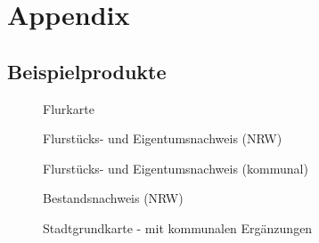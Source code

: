 \part*{Appendix}
\appendix
\chapter{Beispielprodukte}
\begin{figure}[htbp]
	\centering
	\caption{Flurkarte}
	\label{fig:flurkarte}
\end{figure}
\begin{figure}[htbp]
	\centering
	\caption{Flurstücks- und Eigentumsnachweis (NRW)}
	\label{fig:eigentumsnachweis_nrw}
\end{figure}
\begin{figure}[htbp]
	\centering
	\caption{Flurstücks- und Eigentumsnachweis (kommunal)}
	\label{fig:eigentumsnachweis_kom}
\end{figure}
\begin{figure}[htbp]
	\centering
	\caption{Bestandsnachweis (NRW)}
	\label{fig:bestandsnachweis_nrw}
\end{figure}
\begin{figure}[htbp]
	\centering
	\caption{Stadtgrundkarte - mit kommunalen Ergänzungen}
	\label{fig:stadtgrundkarte}
\end{figure}

